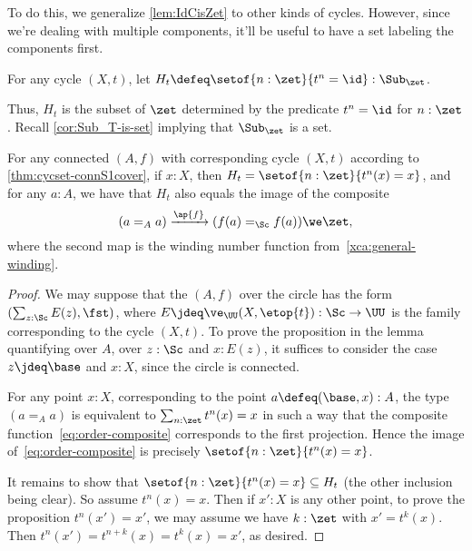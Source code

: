 To do this, we generalize \cref{lem:IdCisZet} to other kinds of cycles.
However, since we're dealing with multiple components,
it'll be useful to have a set labeling the components first.
\begin{definition}\label{def:subgroup-zet-of-cycle}
  For any cycle $(X,t)$,
  let $H_t \defeq \setof{n:\zet}{t^n=\id} : \Sub_\zet$.
\end{definition}
Thus, $H_t$ is the subset of $\zet$ determined by the predicate $t^n=\id$
for $n:\zet$.
Recall \cref{cor:Sub_T-is-set} implying that $\Sub_\zet$ is a set.
\begin{lemma}\label{lem:cycle-order-point-ap}
  For any connected \covering $(A,f)$ with corresponding cycle $(X,t)$
  according to \cref{thm:cycset-connS1cover},
  if $x:X$, then $H_t = \setof{n:\zet}{t^n(x)=x}$,
  and for any $a:A$, we have that $H_t$
  also equals the image of the composite
  \begin{equation}\label{eq:order-composite}
    (a =_A a) \xrightarrow{\ap{f}}{} (f(a) =_\Sc f(a)) \we \zet,
  \end{equation}
  where the second map is the winding number function
  from~\cref{xca:general-winding}.
\end{lemma}
\begin{proof}
  We may suppose that the \covering $(A,f)$ over the circle
  has the form $(\sum_{z:\Sc} E(z),\fst)$, where
  $E\jdeq\ve_\UU(X,\etop{t}) : \Sc\to\UU$ is the family corresponding
  to the cycle $(X,t)$.
  To prove the proposition in the lemma quantifying over $A$, \ie
  over $z:\Sc$ and $x:E(z)$, it suffices to consider the case
  $z\jdeq\base$ and $x:X$, since the circle is connected.

  For any point $x:X$, corresponding to the point $a\defeq(\base,x):A$,
  the type $(a =_A a)$ is equivalent to $\sum_{n:\zet}t^n(x)=x$
  in such a way that the composite function~\eqref{eq:order-composite}
  corresponds to the first projection.
  Hence the image of~\eqref{eq:order-composite} is precisely
  $\setof{n:\zet}{t^n(x)=x}$.

  It remains to show that $\setof{n:\zet}{t^n(x)=x} \subseteq H_t$
  (the other inclusion being clear).
  So assume $t^n(x)=x$.
  Then if $x':X$ is any other point, to prove the proposition
  $t^n(x')=x'$, we may assume we have $k:\zet$ with $x'=t^k(x)$. Then
  $t^n(x')=t^{n+k}(x)=t^k(x)=x'$, as desired.
\end{proof}

